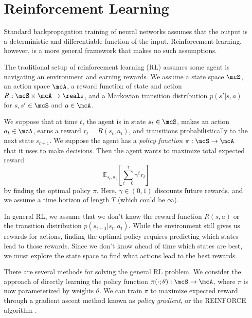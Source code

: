 \documentclass[12pt]{report}
\begin{document}
\section{Reinforcement Learning}

Standard backpropagation training of neural networks assumes that the output is a deterministic and differentiable function of the input. Reinforcement learning, however, is a more general framework that makes no such assumptions.

The traditional setup of reinforcement learning (RL) assumes some agent is navigating an environment and earning rewards.
We assume a state space $\mcS$, an action space $\mcA$, a reward function of state and action $R : \mcS \times \mcA \to \reals$, and a Markovian transition distribution $p(s' | s, a)$ for $s, s' \in \mcS$ and $a \in \mcA$.

We suppose that at time $t$, the agent is in state $s_t \in \mcS$, makes an action $a_t \in \mcA$, earns a reward $r_t = R(s_t, a_t)$, and transitions probabilistically to the next state $s_{t+1}$. We suppose the agent has a \emph{policy function} $\pi : \mcS \to \mcA$ that it uses to make decisions. Then the agent wants to maximize total expected reward
$$\mathbb{E}_{s_t, a_t} \left[\sum_{t=0}^T \gamma^t r_t \right]$$
by finding the optimal policy $\pi$. Here, $\gamma \in (0,1)$ discounts future rewards, and we assume a time horizon of length $T$ (which could be $\infty$).


In general RL, we assume that we don't know the reward function $R(s,a)$ or the transition distribution $p(s_{t+1} | s_t, a_t)$. While the environment still gives us rewards for actions, finding the optimal policy requires predicting which states lead to those rewards.
Since we don't know ahead of time which states are best, we must explore the state space to find what actions lead to the best rewards.

There are several methods for solving the general RL problem.
We consider the approach of directly learning the policy function $\pi( \cdot ; \theta) : \mcS \to \mcA$, where $\pi$ is now parameterized by weights $\theta$. We can train $\pi$  to maximize expected reward through a gradient ascent method known as \emph{policy gradient}, or the REINFORCE algorithm \citep{williams1992reinforce}.
\end{document}
